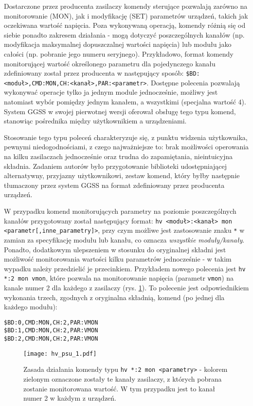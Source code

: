 Dostarczone przez producenta zasilaczy komendy sterujące pozwalają zarówno na monitorowanie (MON), jak i modyfikację (SET) parametrów urządzeń, takich jak oczekiwana wartość napięcia. Poza wykonywaną operacją, komendy różnią się od siebie ponadto zakresem działania - mogą dotyczyć poszczególnych kanałów (np. modyfikacja maksymalnej dopuszczalnej wartości napięcia) lub modułu jako całości (np. pobranie jego numeru seryjnego). Przykładowo, format komendy monitorującej wartość określonego parametru dla pojedynczego kanału zdefiniowany został przez producenta w następujący sposób: \lstinline{$BD:<moduł>,CMD:MON,CH:<kanał>,PAR:<parametr>}. Dostępne polecenia pozwalają wykonywać operacje tylko ja jednym module jednocześnie, możliwy jest natomiast wybór pomiędzy jednym kanałem, a wszystkimi (specjalna wartość 4). System GGSS w swojej pierwotnej wersji oferował obsługę tego typu komend, stanowiąc pośrednika między użytkownikiem a urządzeniami.

Stosowanie tego typu poleceń charakteryzuje się, z punktu widzenia użytkownika, pewnymi niedogodnościami, z czego najważniejsze to: brak możliwości operowania na kilku zasilaczach jednocześnie oraz trudna do zapamiętania, nieintuicyjna składnia. Zadaniem autorów było przygotowanie biblioteki udostępniającej alternatywny, przyjazny użytkownikowi, zestaw komend, który byłby następnie tłumaczony przez system GGSS na format zdefiniowany przez producenta urządzeń. 

W przypadku komend monitorujących parametry na poziomie poszczególnych kanałów przygotowany został następujący format: \lstinline{hv <moduł>:<kanał> mon <parametr[,inne_parametry]>}, przy czym możliwe jest zastosowanie znaku \lstinline{*} w zamian za specyfikację modułu lub kanału, co oznacza \emph{wszystkie moduły/kanały}. Ponadto, dodatkowym ulepszeniem w stosunku do oryginalnej składni jest możliwość monitorowania wartości kilku parametrów jednocześnie - w takim wypadku należy przedzielić je przecinkiem. Przykładem nowego polecenia jest \lstinline{hv *:2 mon vmon}, które pozwala na monitorowanie napięcia (parametr \lstinline{vmon}) na kanale numer 2 dla każdego z zasilaczy (rys. \ref{fig:psu1}). To polecenie jest odpowiednikiem wykonania trzech, zgodnych z oryginalna składnią, komend (po jednej dla każdego modułu):
\begin{lstlisting}
$BD:0,CMD:MON,CH:2,PAR:VMON
$BD:1,CMD:MON,CH:2,PAR:VMON
$BD:2,CMD:MON,CH:2,PAR:VMON
\end{lstlisting}

\begin{figure}[H]
\centering
\texttt{[image: hv\_psu\_1.pdf]}
\caption{Zasada działania komendy typu \lstinline{hv *:2 mon <parametry>} - kolorem zielonym oznaczone zostały te kanały zasilaczy, z których pobrana zostanie monitorowana wartość. W tym przypadku jest to kanał numer 2 w każdym z urządzeń.}
\label{fig:psu1}
\end{figure}

